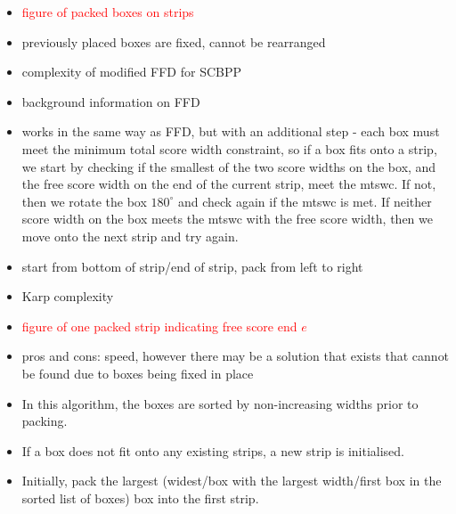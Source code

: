 \documentclass[oribibl]{llncs}
\begin{document}
\begin{itemize}
	\item \textcolor{red}{figure of packed boxes on strips}
	\item previously placed boxes are fixed, cannot be rearranged
	\item complexity of modified FFD for SCBPP
	\item background information on FFD
	\item works in the same way as FFD, but with an additional step - each box must meet the minimum total score width constraint, so if a box fits onto a strip, we start by checking if the smallest of the two score widths on the box, and the free score width on the end of the current strip, meet the mtswc. If not, then we rotate the box $180^{\circ}$ and check again if the mtswc is met. If neither score width on the box meets the mtswc with the free score width, then we move onto the next strip and try again.
	\item start from bottom of strip/end of strip, pack from left to right
	\item Karp complexity
	\item \textcolor{red}{figure of one packed strip indicating free score end $e$}
	\item pros and cons: speed, however there may be a solution that exists that cannot be found due to boxes being fixed in place
	\item In this algorithm, the boxes are sorted by non-increasing widths prior to packing.
	\item If a box does not fit onto any existing strips, a new strip is initialised.
	\item Initially, pack the largest (widest/box with the largest width/first box in the sorted list of boxes) box into the first strip.
	
	
\end{itemize}
\end{document}
